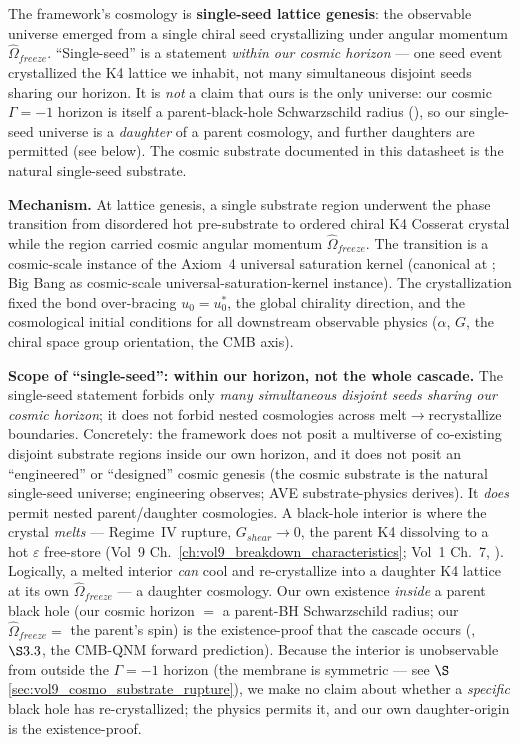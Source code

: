 The framework's cosmology is \textbf{single-seed lattice genesis}: the observable universe emerged from a single chiral seed crystallizing under angular momentum $\hat{\Omega}_{freeze}$. ``Single-seed'' is a statement \emph{within our cosmic horizon} --- one seed event crystallized the K4 lattice we inhabit, not many simultaneous disjoint seeds sharing our horizon. It is \emph{not} a claim that ours is the only universe: our cosmic $\Gamma=-1$\gammaundeclared{} horizon is itself a parent-black-hole Schwarzschild radius (), so our single-seed universe is a \emph{daughter} of a parent cosmology, and further daughters are permitted (see below). The cosmic substrate documented in this datasheet is the natural single-seed substrate.

\textbf{Mechanism.} At lattice genesis, a single substrate region underwent the phase transition from disordered hot pre-substrate to ordered chiral K4 Cosserat crystal while the region carried cosmic angular momentum $\hat{\Omega}_{freeze}$. The transition is a cosmic-scale instance of the Axiom~4 universal saturation kernel (canonical at ; Big Bang as cosmic-scale universal-saturation-kernel instance). The crystallization fixed the bond over-bracing $u_0 = u_0^*$, the global chirality direction, and the cosmological initial conditions for all downstream observable physics ($\alpha$, $G$, the chiral space group orientation, the CMB axis).

\textbf{Scope of ``single-seed'': within our horizon, not the whole cascade.} The single-seed statement forbids only \emph{many simultaneous disjoint seeds sharing our cosmic horizon}; it does not forbid nested cosmologies across melt$\to$recrystallize boundaries. Concretely: the framework does not posit a multiverse of co-existing disjoint substrate regions inside our own horizon, and it does not posit an ``engineered'' or ``designed'' cosmic genesis (the cosmic substrate is the natural single-seed universe; engineering observes; AVE substrate-physics derives). It \emph{does} permit nested parent/daughter cosmologies. A black-hole interior is where the crystal \emph{melts} --- Regime~IV rupture, $G_{shear}\to0$, the parent K4 dissolving to a hot $\varepsilon$ free-store (Vol~9 Ch.~\ref{ch:vol9_breakdown_characteristics}; Vol~1 Ch.~7, ). Logically, a melted interior \emph{can} cool and re-crystallize into a daughter K4 lattice at its own $\hat{\Omega}_{freeze}$ --- a daughter cosmology. Our own existence \emph{inside} a parent black hole (our cosmic horizon $=$ a parent-BH Schwarzschild radius; our $\hat{\Omega}_{freeze}=$ the parent's spin) is the existence-proof that the cascade occurs (,  $\S3.3$, the CMB-QNM forward prediction). Because the interior is unobservable from outside the $\Gamma=-1$\gammaundeclared{} horizon (the membrane is symmetric --- see $\S$\ref{sec:vol9_cosmo_substrate_rupture}), we make no claim about whether a \emph{specific} black hole has re-crystallized; the physics permits it, and our own daughter-origin is the existence-proof.

